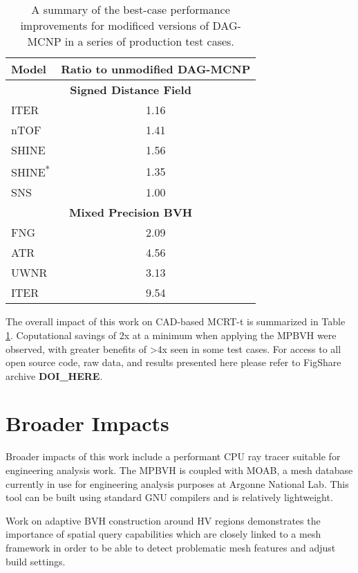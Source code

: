 \begin{table}[H]
  \small
  \centering
  \begin{tabular}{lc}
    \toprule
    \textbf{Model} & \textbf{Ratio to unmodified DAG-MCNP} \\
    \hline
    \multicolumn{2}{c}{\textbf{Signed Distance Field}} \\
    \hline
    ITER  & 1.16 \\
    nTOF  & 1.41 \\
    SHINE & 1.56 \\
    SHINE\textsuperscript{*} & 1.35 \\
    SNS   & 1.00 \\
    \hline
    \multicolumn{2}{c}{\textbf{Mixed Precision BVH}} \\
    \hline
    FNG  & 2.09  \\
    ATR  & 4.56  \\
    UWNR & 3.13  \\
    ITER & 9.54  \\
    \bottomrule
  \end{tabular}
  \caption[A summary of performance improvements in this work]{A summary of the
    best-case performance improvements for modificed versions of DAG-MCNP in a
    series of production test cases.}
  \label{tab:the_rub}
\end{table}

The overall impact of this work on CAD-based MCRT-t is summarized in Table
\ref{tab:the_rub}. Coputational savings of 2x at a minimum when applying the
MPBVH were observed, with greater benefits of >4x seen in some test cases. For
access to all open source code, raw data, and results presented here please
refer to FigShare archive \textbf{DOI\_HERE}.

\section{Broader Impacts}\label{sec:other_contrib}

Broader impacts of this work include a performant CPU ray tracer suitable for
engineering analysis work. The MPBVH is coupled with MOAB, a mesh database
currently in use for engineering analysis purposes at Argonne National Lab. This
tool can be built using standard GNU compilers and is relatively lightweight.

Work on adaptive BVH construction around HV regions demonstrates the importance
of spatial query capabilities which are closely linked to a mesh framework in
order to be able to detect problematic mesh features and adjust build settings.

